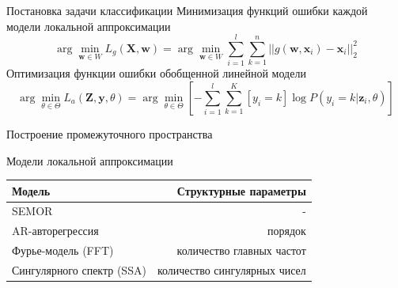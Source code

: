 \documentclass{beamer}
\newcommand{\bz}{\mathbf{z}}
\newcommand{\bx}{\mathbf{x}}
\newcommand{\by}{\mathbf{y}}
\newcommand{\bw}{\mathbf{w}}
\newcommand{\bX}{\mathbf{X}}
\newcommand{\bZ}{\mathbf{Z}}
\newcommand{\sbrs}[1]{\left[#1\right]}
\begin{document}

\begin{frame}{Постановка задачи классификации}
    Минимизация функций ошибки каждой модели локальной аппроксимации
    $$
    \arg\min_{\bw \in W} L_g(\bX, \bw) = \arg\min_{\bw \in W} \sum_{i=1}^l\sum_{k=1}^n ||g(\bw, \bx_i) - \bx_i||_2^2
    $$
    Оптимизация функции ошибки обобщенной линейной модели
    $$
    \arg\min_{\theta \in \Theta} L_a(\bZ, \by, \mathbb{\theta}) = \arg\min_{\mathbb{\theta} \in \Theta} \sbrs{-\sum_{i=1}^l\sum_{k=1}^K [y_i = k]\log P(y_i = k| \bz_i, \mathbb{\theta})}
    $$
\end{frame}



\begin{frame}{Построение промежуточного пространства}
    \begin{block}{Модели локальной аппроксимации}
    \begin{center}
        \begin{tabular}{|l|r|}
            \hline
            Модель & Структурные параметры \\
            \hline
            SEMOR & - \\
            AR-авторегрессия & порядок \\
            Фурье-модель (FFT) & количество главных частот \\
            Сингулярного спектр (SSA) & количество сингулярных чисел\\
            \hline
            \end{tabular}
    \end{center}
    \end{block}
\end{frame}

\end{document}

